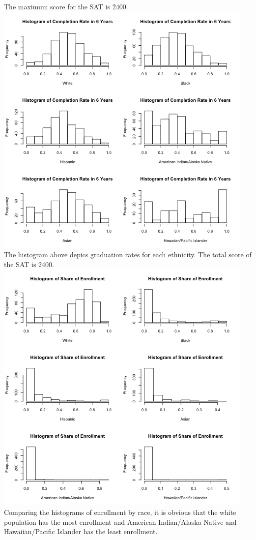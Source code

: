 \documentclass{article}
\begin{document}
The maximum score for the SAT is 2400.
\includegraphics{../../images/histogram_race_completion}
The histogram above depics graduation rates for each ethnicity. 
The total score of the SAT is 2400.
\includegraphics{../../images/histogram_race_enrollment.png}
Comparing the histograms of enrollment by race, it is obvious that the white population has the most enrollment and American Indian/Alaska Native and Hawaiian/Pacific Islander has the least enrollment.
\end{document}
